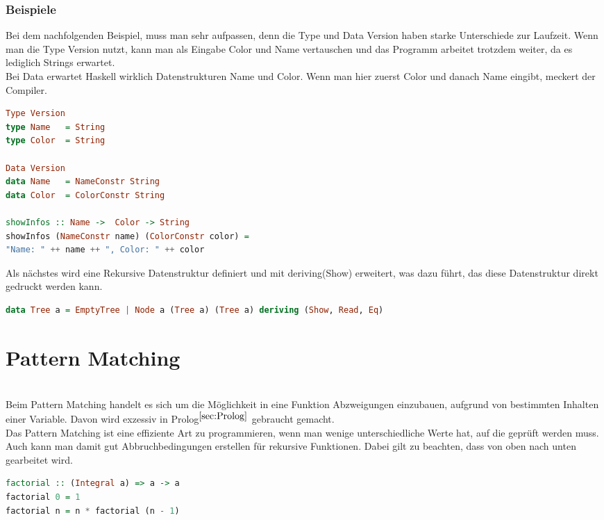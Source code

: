 \subsubsection{Beispiele}
Bei dem nachfolgenden Beispiel, muss man sehr aufpassen, denn die Type und Data Version haben starke Unterschiede zur Laufzeit. Wenn man die Type Version nutzt, kann man als Eingabe Color und Name vertauschen und das Programm arbeitet trotzdem weiter, da es lediglich Strings erwartet. \\
Bei Data erwartet Haskell wirklich Datenstrukturen Name und Color. Wenn man hier zuerst Color und danach Name eingibt, meckert der Compiler. 

\begin{lstlisting}[language=Haskell]  
Type Version
type Name   = String
type Color  = String

Data Version
data Name   = NameConstr String
data Color  = ColorConstr String

showInfos :: Name ->  Color -> String
showInfos (NameConstr name) (ColorConstr color) =
"Name: " ++ name ++ ", Color: " ++ color
\end{lstlisting}\qquad\newline
Als nächstes wird eine Rekursive Datenstruktur definiert und mit deriving(Show) erweitert, was dazu führt, das diese Datenstruktur direkt gedruckt werden kann. 
\begin{lstlisting}[language=Haskell]  
data Tree a = EmptyTree | Node a (Tree a) (Tree a) deriving (Show, Read, Eq)  
\end{lstlisting}
\section{Pattern Matching}\qquad\\
Beim Pattern Matching handelt es sich um die Möglichkeit in eine Funktion Abzweigungen einzubauen, aufgrund von bestimmten Inhalten einer Variable. Davon wird exzessiv in Prolog$^{\ref{sec:Prolog}}$ gebraucht gemacht. \\
Das Pattern Matching ist eine effiziente Art zu programmieren, wenn man wenige unterschiedliche Werte hat, auf die geprüft werden muss. Auch kann man damit gut Abbruchbedingungen erstellen für rekursive Funktionen. Dabei gilt zu beachten, dass von oben nach unten gearbeitet wird. 
\begin{lstlisting}[language=Haskell]
factorial :: (Integral a) => a -> a  
factorial 0 = 1  
factorial n = n * factorial (n - 1)  
\end{lstlisting}

